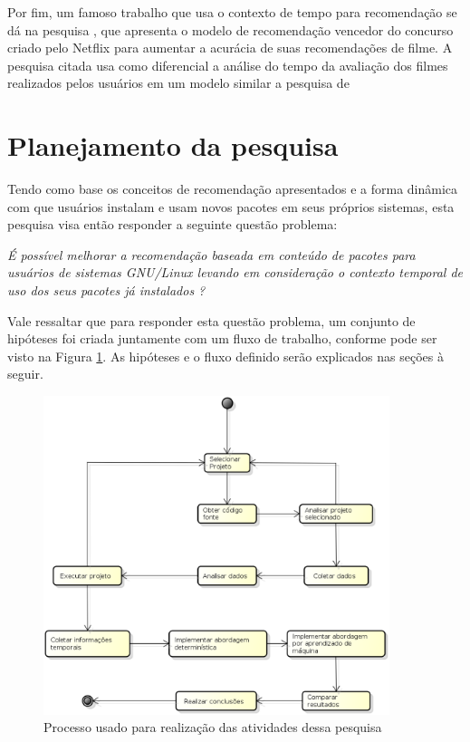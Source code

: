 Por fim, um famoso trabalho que usa o contexto de tempo para recomendação se dá na pesquisa \cite{koren2010collaborative}, que apresenta o modelo de recomendação
vencedor do concurso criado pelo Netflix para aumentar a acurácia de suas recomendações de filme. A pesquisa citada usa como diferencial a análise do tempo da avaliação
dos filmes realizados pelos usuários em um modelo similar a pesquisa de \cite{basile2015modeling}


\section{Planejamento da pesquisa}

Tendo como base os conceitos de recomendação apresentados e a forma dinâmica com
que usuários instalam e usam novos pacotes em seus próprios sistemas, esta
pesquisa visa então responder a seguinte questão problema:

\begin{center}
\textit{É possível melhorar a recomendação baseada em conteúdo de pacotes para
usuários de sistemas GNU/Linux levando em consideração o contexto temporal de
uso dos seus pacotes já instalados ?}
\end{center}

Vale ressaltar que para responder esta questão problema, um conjunto de
hipóteses foi criada juntamente com um fluxo de trabalho, conforme pode ser visto na
Figura \ref{fig:planejamento_pesquisa}. As hipóteses e o fluxo definido serão
explicados nas seções à seguir.

\begin{figure}[h]
  \centering
  \includegraphics[width=0.9\textwidth]{figuras/planejamento_pesquisa.eps}
  \caption{Processo usado para realização das atividades dessa pesquisa}
  \label{fig:planejamento_pesquisa}
\end{figure}

